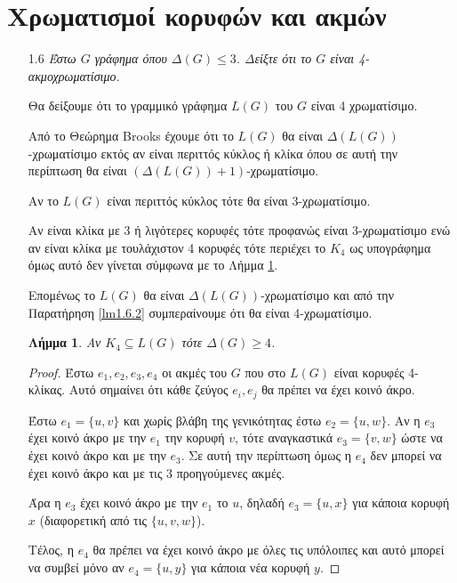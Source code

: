 \documentclass[a4paper, oneside, 11pt]{article}
\newtheorem{lm}[thm]{Λήμμα}
\theoremstyle{definition}
\begin{document}


\section{Χρωματισμοί κορυφών και ακμών}
\begin{enumerate}
   \item[1.6] \emph{Έστω $G$ γράφημα όπου $\Delta(G) \leq 3$. Δείξτε ότι το
              $G$ είναι 4-ακμοχρωματίσιμο.}

   Θα δείξουμε ότι το γραμμικό γράφημα $L(G)$ του $G$ είναι 4 χρωματίσιμο.

   Από το Θεώρημα Brooks έχουμε ότι το $L(G)$ θα είναι
   $\Delta(L(G))$-χρωματίσιμο εκτός αν είναι περιττός κύκλος
   ή κλίκα όπου σε αυτή την περίπτωση θα είναι $(\Delta(L(G)) + 1)$-χρωματίσιμο.

   Αν το $L(G)$ είναι περιττός κύκλος τότε θα είναι 3-χρωματίσιμο.

   Αν είναι κλίκα με 3 ή λιγότερες κορυφές τότε προφανώς είναι
   3-χρωματίσιμο ενώ αν είναι κλίκα με τουλάχιστον 4 κορυφές τότε
   περιέχει το $K_4$ ως υπογράφημα όμως αυτό δεν γίνεται
   σύμφωνα με το Λήμμα \ref{lm1.6.1}.

   Επομένως το $L(G)$ θα είναι $\Delta(L(G))$-χρωματίσιμο και από
   την Παρατήρηση \ref{lm1.6.2} συμπεραίνουμε ότι θα είναι
   4-χρωματίσιμο.
   
   \begin{lm}
      \label{lm1.6.1}
      Αν $K_4 \subseteq L(G)$ τότε $\Delta(G) \geq 4$.
   \end{lm}
   \begin{proof}
      Έστω $e_1, e_2, e_3, e_4$ οι ακμές του $G$ που στο $L(G)$ είναι
      κορυφές 4-κλίκας. Αυτό σημαίνει ότι κάθε ζεύγος $e_i, e_j$ θα πρέπει
      να έχει κοινό άκρο.

      Έστω $e_1 = \{u, v\}$ και χωρίς βλάβη της γενικότητας έστω
      $e_2 = \{u, w\}$. Αν η $e_3$ έχει κοινό άκρο με την $e_1$
      την κορυφή $v$, τότε αναγκαστικά $e_3 = \{v, w\}$ ώστε να έχει
      κοινό άκρο και με την $e_3$. Σε αυτή την περίπτωση όμως η $e_4$
      δεν μπορεί να έχει κοινό άκρο και με τις 3 προηγούμενες ακμές.

      Άρα η $e_3$ έχει κοινό άκρο με την $e_1$ το $u$, δηλαδή
      $e_3 = \{ u, x \}$ για κάποια κορυφή $x$ (διαφορετική από
      τις $\{u, v, w\}$).

      Τέλος, η $e_4$ θα πρέπει να έχει κοινό άκρο με όλες τις υπόλοιπες
      και αυτό μπορεί να συμβεί μόνο αν $e_4 = \{u, y\}$ για κάποια
      νέα κορυφή $y$.


\end{proof}
\end{enumerate}
\end{document}

